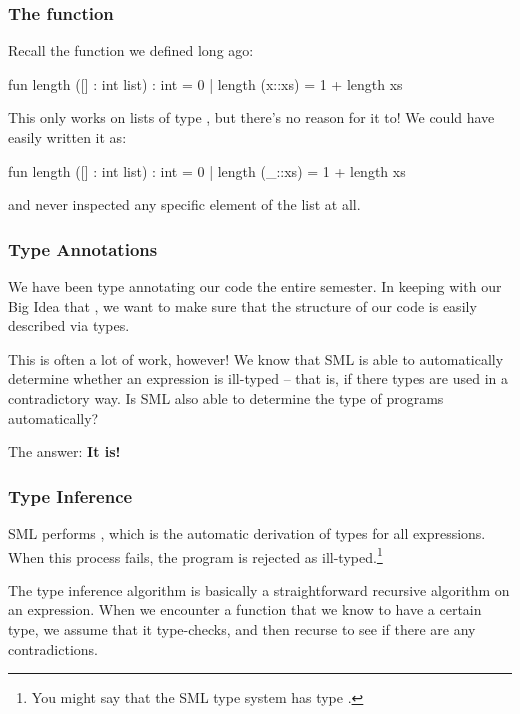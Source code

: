 \documentclass[aspectratio=169, handout]{beamer}
\begin{document}
\begin{frame}[fragile]
  \frametitle{The  function}

  Recall the  function we defined long ago:

  \pause
  \begin{codeblock}
    fun length ([] : int list) : int = 0
      | length (x::xs) = 1 + length xs
  \end{codeblock}

  \pause
  \vspace{\fill}

  This only works on lists of type , but there's no reason for it
  to! We could have easily written it as:

  \pause
  \begin{codeblock}
    fun length ([] : int list) : int = 0
      | length (_::xs) = 1 + length xs
  \end{codeblock}

  and never inspected any specific element of the list at all.
\end{frame}

\begin{frame}[fragile]
  \frametitle{Type Annotations}

  \tgs

  We have been type annotating our code the entire semester. In keeping with
  our Big Idea that , we want to make sure that
  the structure of our code is easily described via types.

  \pause
  \vspace{\fill}

  This is often a lot of work, however! We know that SML is able to automatically
  determine whether an expression is ill-typed -- that is, if there types are
  used in a contradictory way. Is SML also able to determine the type of programs
  automatically?

  \pause
  \vspace{\fill}

  The answer: \textbf{It is!}
\end{frame}

\begin{frame}[fragile]
  \frametitle{Type Inference}

  SML performs , which is the automatic derivation of
  types for all expressions. When this process fails, the program is rejected
  as ill-typed.\footnote{
    You might say that the SML type system has type .
  }

  \pause
  \vspace{\fill}

  The type inference algorithm is basically a straightforward recursive
  algorithm on an expression. When we encounter a function that we know to have
  a certain type, we assume that it type-checks, and then recurse to see
  if there are any contradictions.
\end{frame}
\end{document}
